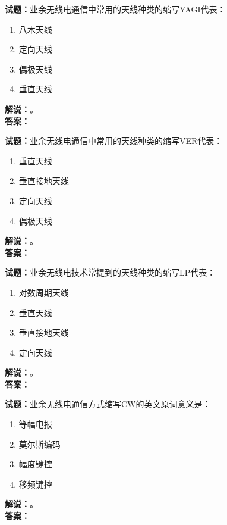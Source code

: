 \documentclass{ctexbook}
\begin{document}
\bigskip

\noindent\textbf{试题：}业余无线电通信中常用的天线种类的缩写YAGI代表：
\begin{enumerate}[leftmargin=3em]
  \item 八木天线
  \item 定向天线
  \item 偶极天线
  \item 垂直天线
\end{enumerate}
\noindent\textbf{解说：}\textbf{}。\\\noindent\textbf{答案：}

\bigskip

\noindent\textbf{试题：}业余无线电通信中常用的天线种类的缩写VER代表：
\begin{enumerate}[leftmargin=3em]
  \item 垂直天线
  \item 垂直接地天线
  \item 定向天线
  \item 偶极天线
\end{enumerate}
\noindent\textbf{解说：}\textbf{}。\\\noindent\textbf{答案：}

\bigskip

\noindent\textbf{试题：}业余无线电技术常提到的天线种类的缩写LP代表：
\begin{enumerate}[leftmargin=3em]
  \item 对数周期天线
  \item 垂直天线
  \item 垂直接地天线
  \item 定向天线
\end{enumerate}
\noindent\textbf{解说：}\textbf{}。\\\noindent\textbf{答案：}

\bigskip

\noindent\textbf{试题：}业余无线电通信方式缩写CW的英文原词意义是：
\begin{enumerate}[leftmargin=3em]
  \item 等幅电报
  \item 莫尔斯编码
  \item 幅度键控
  \item 移频键控
\end{enumerate}
\noindent\textbf{解说：}\textbf{}。\\\noindent\textbf{答案：}

\bigskip
\end{document}
